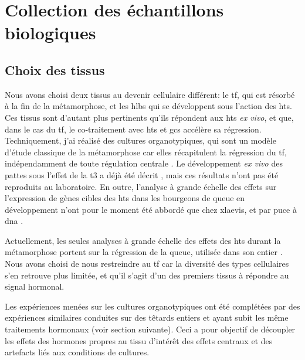 \documentclass[../main.tex]{subfiles}
\begin{document}

\section{Collection des échantillons biologiques}\label{sec:col-bio-samples}

\subsection{Choix des tissus}


Nous avons choisi deux tissus au devenir cellulaire différent: le \gls{tf}, qui est résorbé à la fin de la métamorphose, et les \glspl{hlb} qui se développent sous l'action des \glspl{ht}.
Ces tissus sont d'autant plus pertinents qu'ils répondent aux \glspl{ht} \textit{ex vivo}, et que, dans le cas du \gls{tf}, le co-traitement avec \glspl{ht} et \glspl{gc} accélère sa régression.
Techniquement, j'ai réalisé des cultures organotypiques, qui sont un modèle d'étude classique de la métamorphose car elles récapitulent la régression du \gls{tf}, indépendamment de toute régulation centrale \citep{Kikuyama1982,Kikuyama1983,Galton1990}.
Le développement \textit{ex vivo} des pattes sous l'effet de la \gls{t3} a déjà été décrit \citep{Tata1991}, mais ces résultats n'ont pas été reproduits au laboratoire.
En outre, l'analyse à grande échelle des effets sur l'expression de gènes cibles des \glspl{ht} dans les bourgeons de queue en développement n'ont pour le moment été abbordé que chez \gls{xlaevis}, et par puce à \gls{dna} \citep{Buckbinder1992}.
\par
Actuellement, les seules analyses à grande échelle des effets des \glspl{ht} durant la métamorphose portent sur la régression de la queue, utilisée dans son entier \citep{Wang1993,Helbing2003,Kulkarni2012}.
Nous avons choisi de nous restreindre au \gls{tf} car la diversité des types cellulaires s'en retrouve plus limitée, et qu'il s'agit d'un des premiers tissus à répondre au signal hormonal.
\par
Les expériences menées sur les cultures organotypiques ont été complétées par des expériences similaires conduites sur des têtards entiers et ayant subit les même traitements hormonaux (voir section suivante).
Ceci a pour objectif de découpler les effets des hormones propres au tissu d'intérêt des effets centraux et des artefacts liés aux conditions de cultures.
%
\end{document}
